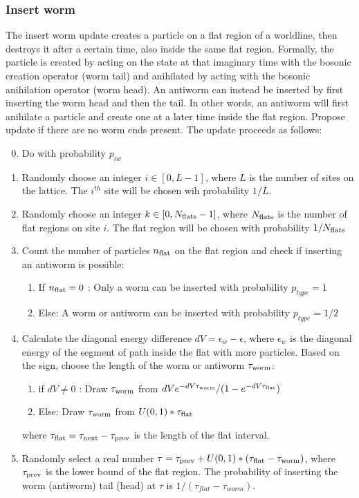\documentclass[12pt, two sided]{article}
\begin{document}
	\subsubsection{Insert worm}      
    The insert worm update creates a particle on a flat region of a worldline, then destroys it after a certain time, also inside the same flat region. Formally, the particle is created by acting on the state at that imaginary time with the bosonic creation operator (worm tail) and anihilated by acting with the bosonic anihilation operator (worm head). An antiworm can instead be inserted by first inserting the worm head and then the tail. In other words, an antiworm will first anihilate a particle and create one at a later time inside the flat region. Propose update if there are no worm ends present. The update proceeds as follows: \\
%
    \begin{enumerate}
        \setcounter{enumi}{-1}
    \item Do with probability $p_{iw}$
        \item Randomly choose an integer $i \in [0,L-1]$, where $L$ is the number of sites on the lattice. The $i^{th}$ site will be chosen wih probability $1/L$.
        \item Randomly choose an integer $k \in [0,N_{\rm{flats}} - 1]$, where $N_{\rm{flats}}$ is the number of flat regions on site $i$. The flat region will be chosen with probability $1/N_{\rm{flats}}$
        \item Count the number of particles $n_{\rm{flat}}$ on the flat region and check if inserting an antiworm is possible:
            \begin{enumerate}
            \item If $n_{\rm{flat}} = 0$ : Only a worm can be inserted with probability $p_{type} = 1$
            \item Else: A worm or antiworm can be inserted with probability $p_{type} = 1/2$
            \end{enumerate}
        \item Calculate the diagonal energy difference $dV = \epsilon_w - \epsilon$, where $\epsilon_w$ is the diagonal energy of the segment of path inside the flat with more particles. Based on the sign, choose the length of the worm or antiworm $\tau_{\rm{worm}}$:
        	     \begin{enumerate}
	     \item{if $dV \neq 0$ : Draw $\tau_{\rm{worm}}$ from $dV e^{-dV\tau_{\rm{worm}}}/(1-e^{-dV \tau_{\rm{flat}}})$}
	     \item{Else: Draw $\tau_{\rm{worm}}$ from $U(0,1)*\tau_{\rm{flat}}$}
	     \end{enumerate}
	     where $\tau_{\rm{flat}} = \tau_{\rm{next}}-\tau_{\rm{prev}}$ is the length of the flat interval.
        \item Randomly select a real number $\tau = \tau_{\rm{prev}} + U(0,1)*(\tau_{\rm{flat}}-\tau_{\rm{worm}})$, where $\tau_{\rm{prev}}$ is the lower bound of the flat region. The probability of inserting the worm (antiworm) tail (head) at $\tau$ is $1/(\tau_{flat} - \tau_{worm})$.
    \end{enumerate}
    
\end{document}
